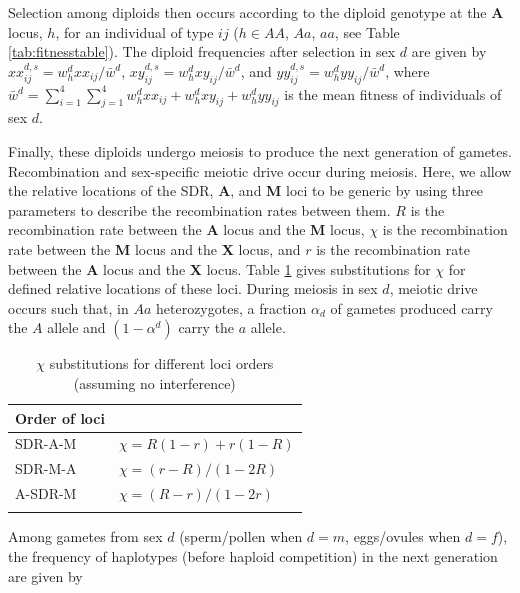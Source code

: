 \documentclass[12pt]{article}
\begin{document}
Selection among diploids then occurs according to the diploid genotype at the \textbf{A} locus, $h$, for an individual of type $ij$ ($h \in AA$, $Aa$, $aa$, see Table \ref{tab:fitnesstable}). 
The diploid frequencies after selection in sex $d$ are given by $xx_{ij}^{d,s}=w_{h}^{d} xx_{ij}/\bar{w}^{d}$, $xy_{ij}^{d,s}=w_{h}^{d} xy_{ij}/\bar{w}^{d}$, and $yy_{ij}^{d,s}=w_{h}^{d} yy_{ij}/\bar{w}^{d}$, where $\bar{w}^{d}= \sum_{i=1}^{4}\sum_{j=1}^{4}w_{h}^{d}xx_{ij}+w_{h}^{d}xy_{ij}+w_{h}^{d}yy_{ij}$ is the mean fitness of individuals of sex $d$. 

Finally, these diploids undergo meiosis to produce the next generation of gametes. 
Recombination and sex-specific meiotic drive occur during meiosis.
Here, we allow the relative locations of the SDR, \textbf{A}, and \textbf{M} loci to be generic by using three parameters to describe the recombination rates between them. $R$ is the recombination rate between the \textbf{A} locus and the \textbf{M} locus, $\chi$ is the recombination rate between the \textbf{M} locus and the \textbf{X} locus, and $r$ is the recombination rate between the \textbf{A} locus and the \textbf{X} locus. 
Table \ref{tab:chisubstitutions} gives substitutions for $\chi$ for defined relative locations of these loci.
During meiosis in sex $d$, meiotic drive occurs such that, in $Aa$ heterozygotes, a fraction $\alpha_{d}$ of gametes produced carry the $A$ allele and $(1-\alpha^d)$ carry the $a$ allele. 

\begin{table}[ht]
\centering
\smallskip
\caption{$\chi$ substitutions for different loci orders (assuming no interference)}
\begin{tabular}{l l}
\hline\hline
  Order of loci &   \\ [0.5ex] \hline
  SDR-A-M & $\chi=R(1-r)+r(1-R)$  \\
  SDR-M-A & $\chi=(r-R)/(1-2R)$ \\
  A-SDR-M & $\chi=(R-r)/(1-2r)$ \\
  \hline \hline
  \label{tab:chisubstitutions}
 \end{tabular}
\end{table}

Among gametes from sex $d$ (sperm/pollen when $d=m$, eggs/ovules when $d=f$), the frequency of haplotypes (before haploid competition) in the next generation are given by
\end{document}

